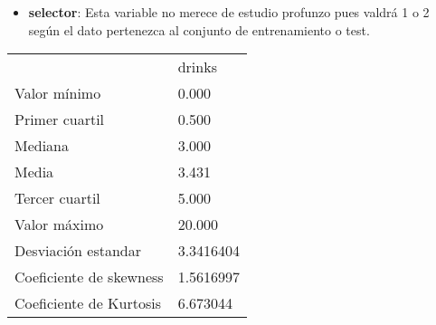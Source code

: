 \begin{itemize}
	
	\item \textbf{selector}: 
	Esta variable no merece de estudio profunzo pues valdrá 1 o 2 según el dato pertenezca al conjunto de entrenamiento o test.
	
	
	
	
\end{itemize}


\begin{table}[]
	\begin{tabular}{ll}
		& drinks    \\
		Valor mínimo            & 0.000     \\
		Primer cuartil          & 0.500     \\
		Mediana                 & 3.000     \\
		Media                   & 3.431     \\
		Tercer cuartil          & 5.000     \\
		Valor máximo            & 20.000    \\ \hline
		Desviación estandar     & 3.3416404 \\ \hline
		Coeficiente de skewness & 1.5616997 \\
		Coeficiente de Kurtosis & 6.673044 
	\end{tabular}
\end{table}
